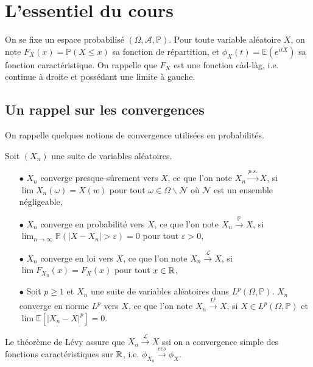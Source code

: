 \section{L'essentiel du cours}

On se fixe un espace probabilisé $(\Omega,\mathcal A ,\mathbb{P})$. Pour toute variable aléatoire $X$, on note $F_X(x)= \mathbb{P}(X\leq x)$ sa fonction de répartition, et $\phi_X(t)= \mathbb{E}(e^{itX})$ sa fonction caractéristique. On rappelle que $F_X$ est une fonction càd-làg, i.e. continue à droite et possédant une limite à gauche.

\subsection{Un rappel sur les convergences}

On rappelle quelques notions de convergence utilisées en probabilités.\\ 

\begin{definition}
Soit $(X_n)$ une suite de variables aléatoires.
\begin{itemize}
\item[$\bullet$] $X_n$ converge presque-sûrement vers $X$, ce que l'on note $X_n \overset{p.s.}{\longrightarrow}X$, si $\lim X_n(\omega) = X(w)$ pour tout $\omega\in \Omega \backslash \mathcal N$ où $\mathcal N$ est un ensemble négligeable, 
\item[$\bullet$] $X_n$ converge en probabilité vers $X$, ce que l'on note $X_n \overset{\mathbb P}{\longrightarrow} X$, si $\lim_{n \rightarrow \infty} \mathbb P (|X-X_n|>\varepsilon)= 0$ pour tout $\varepsilon>0$, 
\item[$\bullet$] $X_n$ converge en loi vers $X$, ce que l'on note $X_n \overset{\mathcal L}{\longrightarrow} X$, si $\lim F_{X_n}(x) = F_X(x)$ pour tout $x\in \mathbb R$,
\item[$\bullet$] Soit $p\geq 1$ et $X_n$ une suite de variables aléatoires dans $L^p(\Omega,\mathbb P)$. $X_n$ converge en norme $L^p$ vers $X$, ce que l'on note $X_n \overset{L^p}{\longrightarrow} X$, si $X \in L^p(\Omega,\mathbb P)$ et $\lim \mathbb{E}[|X_n-X|^p] = 0$.\\ 
\end{itemize}
\end{definition}

Le théorème de Lévy assure que $X_n \overset{\mathcal L}{\longrightarrow} X$ ssi on a convergence simple des fonctions caractéristiques sur $\mathbb R$, i.e. $\phi_{X_n} \overset{cvs}{\longrightarrow} \phi_X $.\\

